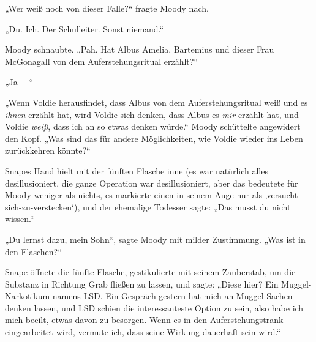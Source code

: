 „Wer weiß noch von dieser Falle?“ fragte Moody nach.

„Du. Ich. Der Schulleiter. Sonst niemand.“

Moody schnaubte.
„Pah. Hat Albus Amelia, Bartemius und dieser Frau McGonagall von dem Auferstehungsritual erzählt?“

„Ja —“

„Wenn Voldie herausfindet, dass Albus von dem Auferstehungsritual weiß und es \emph{ihnen} erzählt hat, wird Voldie sich denken, dass Albus es \emph{mir} erzählt hat, und Voldie \emph{weiß}, dass ich an so etwas denken würde.“ Moody schüttelte angewidert den Kopf.
„Was sind das für andere Möglichkeiten, wie Voldie wieder ins Leben zurückkehren könnte?“

Snapes Hand hielt mit der fünften Flasche inne (es war natürlich alles desillusioniert, die ganze Operation war desillusioniert, aber das bedeutete für Moody weniger als nichts, es markierte einen in seinem Auge nur als ‚versucht-sich-zu-verstecken‘), und der ehemalige Todesser sagte:
„Das musst du nicht wissen.“

„Du lernst dazu, mein Sohn“, sagte Moody mit milder Zustimmung.
„Was ist in den Flaschen?“

Snape öffnete die fünfte Flasche, gestikulierte mit seinem Zauberstab, um die Substanz in Richtung Grab fließen zu lassen, und sagte:
„Diese hier? Ein Muggel-Narkotikum namens LSD. Ein Gespräch gestern hat mich an Muggel-Sachen denken lassen, und LSD schien die interessanteste Option zu sein, also habe ich mich beeilt, etwas davon zu besorgen. Wenn es in den Auferstehungstrank eingearbeitet wird, vermute ich, dass seine Wirkung dauerhaft sein wird.“

